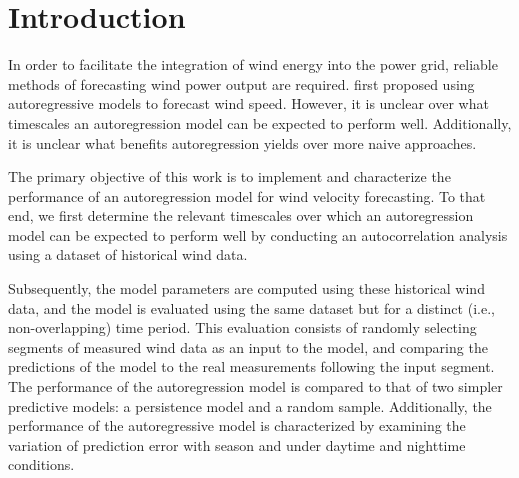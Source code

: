 \documentclass[11pt, oneside]{article}
\begin{document}

\newpage
\pagestyle{pages}
\section{Introduction}
In order to facilitate the integration of wind energy into the power grid, reliable methods of forecasting wind power output are required.
\citet{Brown1984} first proposed using autoregressive models to forecast wind speed.
However, it is unclear over what timescales an autoregression model can be expected to perform well.
Additionally, it is unclear what benefits autoregression yields over more naive approaches.

The primary objective of this work is to implement and characterize the performance of an autoregression model for wind velocity forecasting.
To that end, we first determine the relevant timescales over which an autoregression model can be expected to perform well by conducting an autocorrelation analysis using a dataset of historical wind data.

Subsequently, the model parameters are computed using these historical wind data, and the model is evaluated using the same dataset but for a distinct (i.e., non-overlapping) time period.
This evaluation consists of randomly selecting segments of measured wind data as an input to the model, and comparing the predictions of the model to the real measurements following the input segment.
The performance of the autoregression model is compared to that of two simpler predictive models: a persistence model and a random sample.
Additionally, the performance of the autoregressive model is characterized by examining the variation of prediction error with season and under daytime and nighttime conditions.
\end{document}
